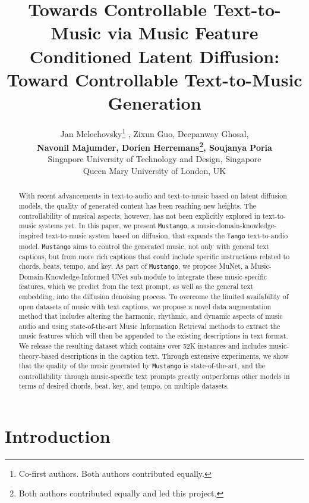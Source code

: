 \documentclass[11pt]{article}
\title{Towards Controllable Text-to-Music via Music Feature Conditioned Latent Diffusion}
\title{\model{}: Toward Controllable Text-to-Music Generation}
\author{Jan Melechovsky\thanks{\hspace{0.2cm} Co-first authors. Both authors contributed equally.} ,
  Zixun Guo\footnotemark[1] ,
  Deepanway Ghosal, \\
  \textbf{Navonil Majumder,
  Dorien Herremans\thanks{\hspace{0.2cm} Both authors contributed equally and led this project.},
  Soujanya Poria\footnotemark[2]}
  \\
   Singapore University of Technology and Design, Singapore\\
   Queen Mary University of London, UK
}
\newcommand{\model}{\texttt{Mustango}}
\begin{document}
\maketitle
{}
\begin{abstract}


With recent advancements in text-to-audio and text-to-music based on latent diffusion models, the quality of generated content has been reaching new heights. The controllability of musical aspects, however, has not been explicitly explored in text-to-music systems yet.
In this paper, we present \model{}, a music-domain-knowledge-inspired text-to-music system based on diffusion, that expands the \texttt{Tango} text-to-audio model. \model{} aims to control the generated music, not only with general text captions, but from more rich captions that could include specific instructions related to chords, beats, tempo, and key. 
As part of \model{}, we propose MuNet, a Music-Domain-Knowledge-Informed UNet sub-module to integrate these music-specific features, which we predict from the text prompt, as well as the general text embedding, into the diffusion denoising process. 
To overcome the limited availability of open datasets of music with text captions, we propose a novel data augmentation method that includes altering the harmonic, rhythmic, and dynamic aspects of music audio and using state-of-the-art Music Information Retrieval methods to extract the music features which will then be appended to the existing descriptions in text format. We release the resulting \dataset{} dataset which contains over 52K instances and includes music-theory-based descriptions in the caption text. 
Through extensive experiments, we show that the quality of the music generated by \model{} is state-of-the-art, and the controllability through music-specific text prompts greatly outperforms other models in terms of desired chords, beat, key, and tempo, on multiple datasets. 
\end{abstract}

\section{Introduction}
\label{sec:intro}
\end{document}
